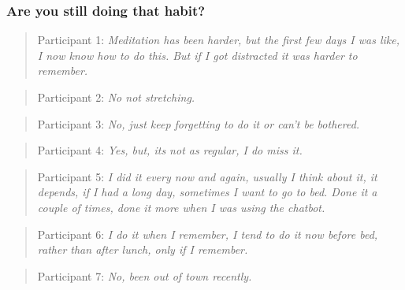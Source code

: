 \subsubsection*{Are you still doing that habit?}
\begin{quote}
Participant 1: \textit{Meditation has been harder, but the first few days I was like, I now know how to do this. But if I got distracted it was harder to remember.}
\end{quote}
\begin{quote}
Participant 2: \textit{No not stretching.}
\end{quote}
\begin{quote}
Participant 3: \textit{No, just keep forgetting to do it or can't be bothered.}
\end{quote}
\begin{quote}
Participant 4: \textit{Yes, but, its not as regular, I do miss it.}
\end{quote}
\begin{quote}
Participant 5: \textit{I did it every now and again, usually I think about it, it depends, if I had a long day, sometimes I want to go to bed. Done it a couple of times, done it more when I was using the chatbot.}
\end{quote}
\begin{quote}
Participant 6: \textit{I do it when I remember, I tend to do it now before bed, rather than after lunch, only if I remember.}
\end{quote}
\begin{quote}
Participant 7: \textit{No, been out of town recently.}
\end{quote}

